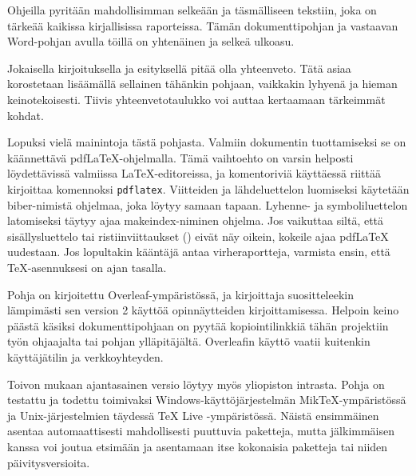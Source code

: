 Ohjeilla pyritään mahdollisimman selkeään ja täsmälliseen tekstiin, joka on tärkeää kaikissa kirjallisissa raporteissa. Tämän dokumenttipohjan ja vastaavan Word-pohjan avulla töillä on yhtenäinen ja selkeä ulkoasu.

Jokaisella kirjoituksella ja esityksellä pitää olla yhteenveto. Tätä asiaa korostetaan lisäämällä sellainen tähänkin pohjaan, vaikkakin lyhyenä ja hieman keinotekoisesti. Tiivis yhteenvetotaulukko voi auttaa kertaamaan tärkeimmät kohdat.

Lopuksi vielä mainintoja tästä pohjasta. Valmiin dokumentin tuottamiseksi se on käännettävä pdf\LaTeX{}-ohjelmalla. Tämä vaihtoehto on varsin helposti löydettävissä valmiissa \LaTeX{}-editoreissa, ja komentoriviä käyttäessä riittää kirjoittaa komennoksi \texttt{pdflatex}. Viitteiden ja lähdeluettelon luomiseksi käytetään biber-nimistä ohjelmaa, joka löytyy samaan tapaan. Lyhenne- ja symboliluettelon latomiseksi täytyy ajaa makeindex-niminen ohjelma. Jos vaikuttaa siltä, että sisällysluettelo tai ristiinviittaukset () eivät näy oikein, kokeile ajaa pdf\LaTeX{} uudestaan. Jos lopultakin kääntäjä antaa virheraportteja, varmista ensin, että \TeX{}-asennuksesi on ajan tasalla.

Pohja on kirjoitettu Overleaf-ympäristössä, ja kirjoittaja suositteleekin lämpimästi sen version 2 käyttöä opinnäytteiden kirjoittamisessa. Helpoin keino päästä käsiksi dokumenttipohjaan on pyytää kopiointilinkkiä tähän projektiin työn ohjaajalta tai pohjan ylläpitäjältä. Overleafin käyttö vaatii kuitenkin käyttäjätilin ja verkkoyhteyden.

Toivon mukaan ajantasainen versio löytyy myös yliopiston intrasta. Pohja on testattu ja todettu toimivaksi Windows-käyttöjärjestelmän Mik\TeX-ympäristössä ja Unix-järjestelmien täydessä \TeX{} Live -ympäristössä. Näistä ensimmäinen asentaa automaattisesti mahdollisesti puuttuvia paketteja, mutta jälkimmäisen kanssa voi joutua etsimään ja asentamaan itse kokonaisia paketteja tai niiden päivitysversioita.